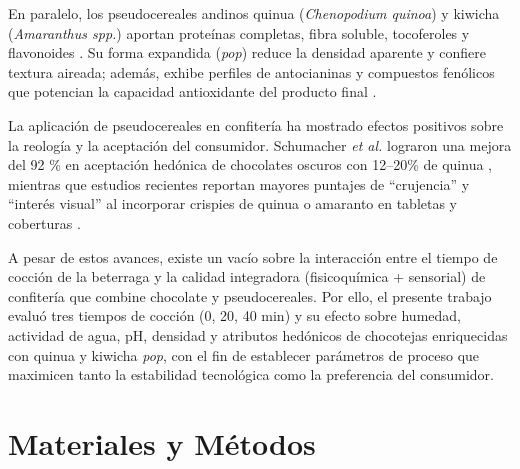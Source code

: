 \documentclass[manuscript,screen,review]{acmart}
\begin{document}
En paralelo, los pseudocereales andinos quinua (\textit{Chenopodium quinoa}) y kiwicha (\textit{Amaranthus spp.}) aportan proteínas completas, fibra soluble, tocoferoles y flavonoides \cite{RepoCarrascoValencia2009,AlvarezJubete2010,Dias2020}.  Su forma expandida (\textit{pop}) reduce la densidad aparente y confiere textura aireada; además, exhibe perfiles de antocianinas y compuestos fenólicos que potencian la capacidad antioxidante del producto final \cite{Pasko2009,Pankajan2022}.  

La aplicación de pseudocereales en confitería ha mostrado efectos positivos sobre la reología y la aceptación del consumidor.  Schumacher \textit{et al.} lograron una mejora del 92 \% en aceptación hedónica de chocolates oscuros con 12–20\% de quinua \cite{Schumacher2010}, mientras que estudios recientes reportan mayores puntajes de “crujencia” y “interés visual” al incorporar crispies de quinua o amaranto en tabletas y coberturas \cite{Simbaqueba2021,Gomes2022,Delgado2019}.  

A pesar de estos avances, existe un vacío sobre la interacción entre el tiempo de cocción de la beterraga y la calidad integradora (fisicoquímica + sensorial) de confitería que combine chocolate y pseudocereales.  Por ello, el presente trabajo evaluó tres tiempos de cocción (0, 20, 40 min) y su efecto sobre humedad, actividad de agua, pH, densidad y atributos hedónicos de chocotejas enriquecidas con quinua y kiwicha \textit{pop}, con el fin de establecer parámetros de proceso que maximicen tanto la estabilidad tecnológica como la preferencia del consumidor.

\section{Materiales y Métodos}
\end{document}
